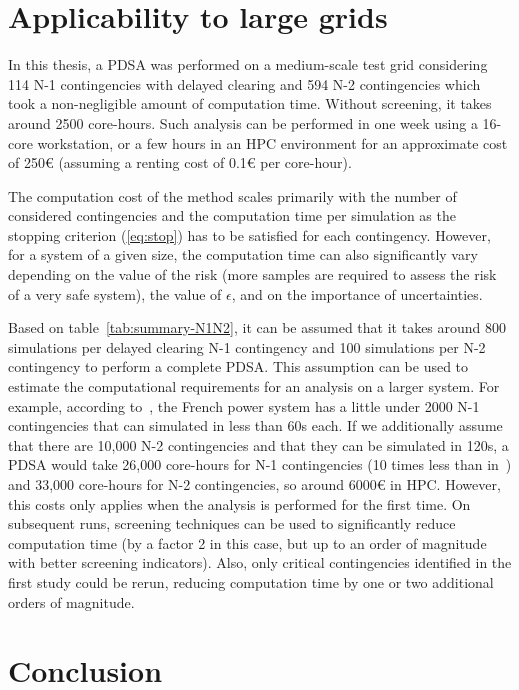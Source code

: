 \section{Applicability to large grids}
\label{sec:PDSA_scalability}


In this thesis, a PDSA was performed on a medium-scale test grid considering 114 N-1 contingencies with delayed clearing and 594 N-2 contingencies which took a non-negligible amount of computation time. Without screening, it takes around 2500 core-hours. Such analysis can be performed in one week using a 16-core workstation, or a few hours in an HPC environment for an approximate cost of 250€ (assuming a renting cost of 0.1€ per core-hour).

The computation cost of the method scales primarily with the number of considered contingencies and the computation time per simulation as the stopping criterion (\ref{eq:stop}) has to be satisfied for each contingency. However, for a system of a given size, the computation time can also significantly vary depending on the value of the risk (more samples are required to assess the risk of a very safe system), the value of \(\epsilon\), and on the importance of uncertainties.

Based on table~\ref{tab:summary-N1N2}, it can be assumed that it takes around 800 simulations per delayed clearing N-1 contingency and 100 simulations per N-2 contingency to perform a complete PDSA. This assumption can be used to estimate the computational requirements for an analysis on a larger system. For example, according to~\cite{EurostagHPC}, the French power system has a little under 2000 N-1 contingencies that can simulated in less than 60s each. If we additionally assume that there are 10,000 N-2 contingencies and that they can be simulated in 120s, a PDSA would take 26,000 core-hours for N-1 contingencies (10 times less than in~\cite{EurostagHPC}) and 33,000 core-hours for N-2 contingencies, so around 6000€ in HPC. However, this costs only applies when the analysis is performed for the first time. On subsequent runs, screening techniques can be used to significantly reduce computation time (by a factor 2 in this case, but up to an order of magnitude with better screening indicators). Also, only critical contingencies identified in the first study could be rerun, reducing computation time by one or two additional orders of magnitude.

\section{Conclusion}
\label{sec:PDSA_conclusion}

